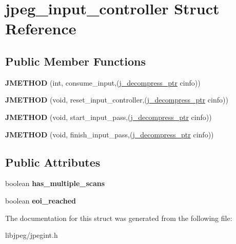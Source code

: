 \hypertarget{structjpeg__input__controller}{\section{jpeg\-\_\-input\-\_\-controller Struct Reference}
\label{structjpeg__input__controller}
}
\subsection*{Public Member Functions}
\begin{DoxyCompactItemize}
\item 
\hypertarget{structjpeg__input__controller_af742c796479db5dd8b3275307d76a103}{{\bfseries J\-M\-E\-T\-H\-O\-D} (int, consume\-\_\-input,(\hyperlink{structjpeg__decompress__struct}{j\-\_\-decompress\-\_\-ptr} cinfo))}\label{structjpeg__input__controller_af742c796479db5dd8b3275307d76a103}

\item 
\hypertarget{structjpeg__input__controller_aa2720adb6f991abedb2e8c03804cac4f}{{\bfseries J\-M\-E\-T\-H\-O\-D} (void, reset\-\_\-input\-\_\-controller,(\hyperlink{structjpeg__decompress__struct}{j\-\_\-decompress\-\_\-ptr} cinfo))}\label{structjpeg__input__controller_aa2720adb6f991abedb2e8c03804cac4f}

\item 
\hypertarget{structjpeg__input__controller_aef985c09924396a078c67592da47d679}{{\bfseries J\-M\-E\-T\-H\-O\-D} (void, start\-\_\-input\-\_\-pass,(\hyperlink{structjpeg__decompress__struct}{j\-\_\-decompress\-\_\-ptr} cinfo))}\label{structjpeg__input__controller_aef985c09924396a078c67592da47d679}

\item 
\hypertarget{structjpeg__input__controller_a70620c8e0ea8fd2f7b0243cd9bf395e1}{{\bfseries J\-M\-E\-T\-H\-O\-D} (void, finish\-\_\-input\-\_\-pass,(\hyperlink{structjpeg__decompress__struct}{j\-\_\-decompress\-\_\-ptr} cinfo))}\label{structjpeg__input__controller_a70620c8e0ea8fd2f7b0243cd9bf395e1}

\end{DoxyCompactItemize}
\subsection*{Public Attributes}
\begin{DoxyCompactItemize}
\item 
\hypertarget{structjpeg__input__controller_a6f02f9c18464bfbf30b27f5a43c2665a}{boolean {\bfseries has\-\_\-multiple\-\_\-scans}}\label{structjpeg__input__controller_a6f02f9c18464bfbf30b27f5a43c2665a}

\item 
\hypertarget{structjpeg__input__controller_a8e1c345f356d36f98c2ece4dc21549d7}{boolean {\bfseries eoi\-\_\-reached}}\label{structjpeg__input__controller_a8e1c345f356d36f98c2ece4dc21549d7}

\end{DoxyCompactItemize}


The documentation for this struct was generated from the following file\-:\begin{DoxyCompactItemize}
\item 
libjpeg/jpegint.\-h\end{DoxyCompactItemize}
